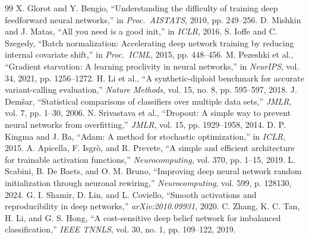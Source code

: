 \documentclass[11pt, a4paper]{article}
\begin{document}
\begin{thebibliography}{99}
 X. Glorot and Y. Bengio, ``Understanding the difficulty of training deep feedforward neural networks,'' in \textit{Proc.\ AISTATS}, 2010, pp. 249--256.
 D. Mishkin and J. Matas, ``All you need is a good init,'' in \textit{ICLR}, 2016.
 S. Ioffe and C. Szegedy, ``Batch normalization: Accelerating deep network training by reducing internal covariate shift,'' in \textit{Proc.\ ICML}, 2015, pp. 448--456.
 M. Pezeshki et al., ``Gradient starvation: A learning proclivity in neural networks,'' in \textit{NeurIPS}, vol. 34, 2021, pp. 1256--1272.
 H. Li et al., ``A synthetic-diploid benchmark for accurate variant-calling evaluation,'' \textit{Nature Methods}, vol. 15, no. 8, pp. 595--597, 2018.
 J. Dem\v{s}ar, ``Statistical comparisons of classifiers over multiple data sets,'' \textit{JMLR}, vol. 7, pp. 1--30, 2006.
 N. Srivastava et al., ``Dropout: A simple way to prevent neural networks from overfitting,'' \textit{JMLR}, vol. 15, pp. 1929--1958, 2014.
 D. P. Kingma and J. Ba, ``Adam: A method for stochastic optimization,'' in \textit{ICLR}, 2015.
 A. Apicella, F. Isgr\`{o}, and R. Prevete, ``A simple and efficient architecture for trainable activation functions,'' \textit{Neurocomputing}, vol. 370, pp. 1--15, 2019.
 L. Scabini, B. De Baets, and O. M. Bruno, ``Improving deep neural network random initialization through neuronal rewiring,'' \textit{Neurocomputing}, vol. 599, p. 128130, 2024.
 G. I. Shamir, D. Lin, and L. Coviello, ``Smooth activations and reproducibility in deep networks,'' \textit{arXiv:2010.09931}, 2020.
 C. Zhang, K. C. Tan, H. Li, and G. S. Hong, ``A cost-sensitive deep belief network for imbalanced classification,'' \textit{IEEE TNNLS}, vol. 30, no. 1, pp. 109--122, 2019.
\end{thebibliography}
\end{document}
